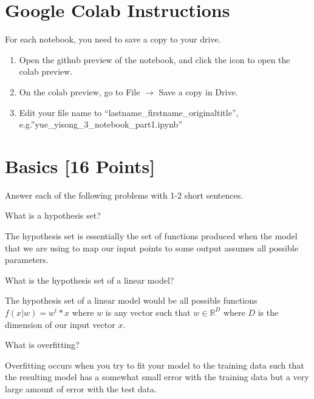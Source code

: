 \section*{Google Colab Instructions}

For each notebook, you need to save a copy to your drive.

\begin{enumerate}
	\item Open the github preview of the notebook, and click the icon to open the colab preview.
	\item On the colab preview, go to File $\rightarrow$ Save a copy in Drive.
	\item Edit your file name to “lastname_firstname_originaltitle”, e.g.”yue_yisong_3_notebook_part1.ipynb”
\end{enumerate}


\newpage
\section{Basics [16 Points]}

Answer each of the following problems with 1-2 short sentences.

\begin{problem}[2]
  What is a hypothesis set?
\end{problem}
\begin{solution}
  The hypothesis set is essentially the set of functions produced when the model that we are using to map our input points to some output assumes all possible parameters.
\end{solution}

\begin{problem}[2]
  What is the hypothesis set of a linear model?
\end{problem}
\begin{solution}
  The hypothesis set of a linear model would be all possible functions $f(x|w) = w^t*x$ where $w$ is any vector such that $w \in \mathbb{R}^D$ where $D$ is the dimension of our input vector $x$.
\end{solution}

\begin{problem}[2]
  What is overfitting?
\end{problem}
\begin{solution}
  Overfitting occurs when you try to fit your model to the training data such that the resulting model has a somewhat small error with the training data but a very large amount of error with the test data.
\end{solution}


